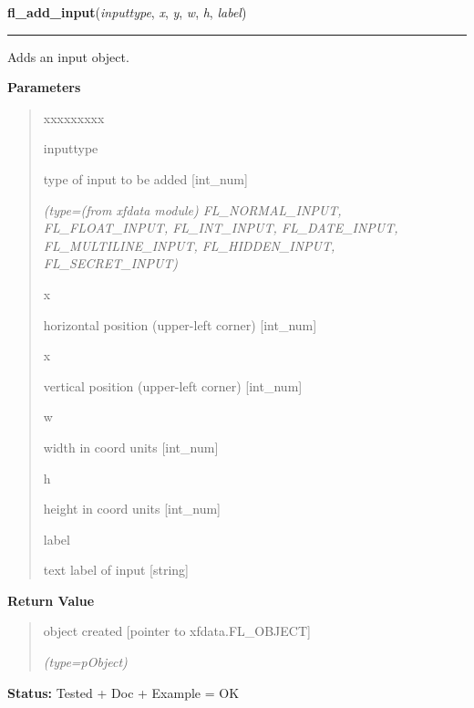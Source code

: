 \hspace{.8\funcindent}\begin{boxedminipage}{\funcwidth}

    \raggedright \textbf{fl\_add\_input}(\textit{inputtype}, \textit{x}, \textit{y}, \textit{w}, \textit{h}, \textit{label})

    \vspace{-1.5ex}

    \rule{\textwidth}{0.5\fboxrule}
\setlength{\parskip}{2ex}
    Adds an input object.

\setlength{\parskip}{1ex}
      \textbf{Parameters}
      \vspace{-1ex}

      \begin{quote}
        \begin{Ventry}{xxxxxxxxx}

          \item[inputtype]

          type of input to be added [int\_num]

            {\it (type=(from xfdata module) FL\_NORMAL\_INPUT, FL\_FLOAT\_INPUT, FL\_INT\_INPUT, 
FL\_DATE\_INPUT, FL\_MULTILINE\_INPUT, FL\_HIDDEN\_INPUT, FL\_SECRET\_INPUT)}

          \item[x]

          horizontal position (upper-left corner) [int\_num]

          \item[x]

          vertical position (upper-left corner) [int\_num]

          \item[w]

          width in coord units [int\_num]

          \item[h]

          height in coord units [int\_num]

          \item[label]

          text label of input [string]

        \end{Ventry}

      \end{quote}

      \textbf{Return Value}
    \vspace{-1ex}

      \begin{quote}
      object created [pointer to xfdata.FL\_OBJECT]

      {\it (type=pObject)}

      \end{quote}

\textbf{Status:} Tested + Doc + Example = OK



    \end{boxedminipage}

